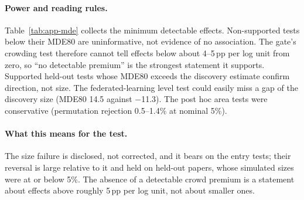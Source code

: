 \paragraph{Power and reading rules.} Table~\ref{tab:app-mde} collects the minimum detectable effects. Non-supported
tests below their MDE80 are uninformative, not evidence of no association. The gate's crowding test therefore cannot
tell effects below about 4--5\,pp per log unit from zero, so ``no detectable premium'' is the strongest statement it
supports. Supported held-out tests whose MDE80 exceeds the discovery estimate confirm direction, not size. The
federated-learning level test could easily miss a gap of the discovery size (MDE80 14.5 against $-$11.3). The
post hoc area tests were conservative (permutation rejection 0.5--1.4\% at nominal 5\%).

\paragraph{What this means for the test.} The size failure is disclosed, not corrected, and it bears on the entry
tests; their reversal is large relative to it and held on held-out papers, whose simulated sizes were at or below
5\%. The absence of a detectable crowd premium is a statement about effects above roughly 5\,pp per log unit, not about
smaller ones.
